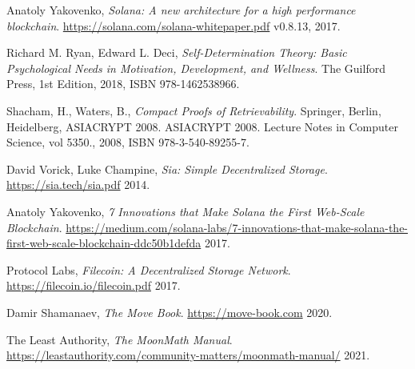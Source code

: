 \documentclass[11 pt]{article}   	%
\begin{document}
\begin{thebibliography}{99}

  Anatoly Yakovenko,
  \textit{Solana: A new architecture for a high performance blockchain}.
  \url{https://solana.com/solana-whitepaper.pdf}
  v0.8.13,
  2017.

  Richard M. Ryan, Edward L. Deci,
  \textit{Self-Determination Theory: Basic Psychological Needs in Motivation, Development, and Wellness}.
  The Guilford Press,
  1st Edition,
  2018,
  ISBN 978-1462538966.

  Shacham, H., Waters, B.,
  \textit{Compact Proofs of Retrievability}.
  Springer, Berlin, Heidelberg,
  ASIACRYPT 2008. ASIACRYPT 2008. Lecture Notes in Computer Science, vol 5350.,
  2008,
  ISBN 978-3-540-89255-7.

  David Vorick, Luke Champine,
  \textit{Sia: Simple Decentralized Storage}.
  \url{https://sia.tech/sia.pdf}
  2014.
  
  Anatoly Yakovenko,
  \textit{7 Innovations that Make Solana the First Web-Scale Blockchain}.
  \url{https://medium.com/solana-labs/7-innovations-that-make-solana-the-first-web-scale-blockchain-ddc50b1defda}
   2017.
 
  Protocol Labs,
  \textit{Filecoin: A Decentralized Storage Network}.
  \url{https://filecoin.io/filecoin.pdf}
  2017.

  Damir Shamanaev,
  \textit{The Move Book}.
  \url{https://move-book.com}
  2020.

  The Least Authority,
  \textit{The MoonMath Manual}.
  \url{https://leastauthority.com/community-matters/moonmath-manual/}
  2021.

\end{thebibliography}
\end{document}
